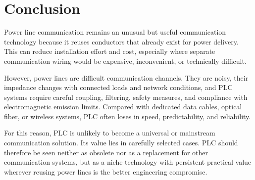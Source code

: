 \section{Conclusion}
\label{sec:conclusion}

Power line communication remains an unusual but useful communication technology because it reuses conductors that already exist for power delivery. This can reduce installation effort and cost, especially where separate communication wiring would be expensive, inconvenient, or technically difficult.

However, power lines are difficult communication channels. They are noisy, their impedance changes with connected loads and network conditions, and PLC systems require careful coupling, filtering, safety measures, and compliance with electromagnetic emission limits. Compared with dedicated data cables, optical fiber, or wireless systems, PLC often loses in speed, predictability, and reliability.

For this reason, PLC is unlikely to become a universal or mainstream communication solution. Its value lies in carefully selected cases. PLC should therefore be seen neither as obsolete nor as a replacement for other communication systems, but as a niche technology with persistent practical value wherever reusing power lines is the better engineering compromise.
